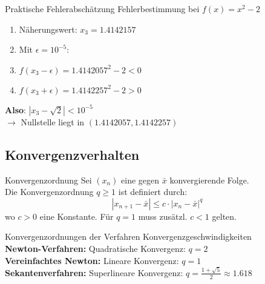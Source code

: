 \begin{example2}{Praktische Fehlerabschätzung} Fehlerbestimmung bei $f(x)=x^2-2$
    \vspace{-1mm}\\
    \begin{minipage}[t]{0.6\textwidth}
        \vspace{-3mm}
        \begin{enumerate}
            \item Näherungswert: $x_3 = 1.4142157$
            \item Mit $\epsilon = 10^{-5}$:
            \item $f(x_3-\epsilon) = 1.4142057^2 - 2 < 0$
            \item $f(x_3+\epsilon) = 1.4142257^2 - 2 > 0$
        \end{enumerate}
    \end{minipage}
    \begin{minipage}[t]{0.35\textwidth}
        \textbf{Also}: $|x_3-\sqrt{2}| < 10^{-5}$
        \vspace{-1mm}\\
        $\rightarrow$ Nullstelle liegt in $(1.4142057, 1.4142257)$
    \end{minipage}
\end{example2}

\subsection{Konvergenzverhalten}

\begin{definition}{Konvergenzordnung}
    Sei $(x_n)$ eine gegen $\bar{x}$ konvergierende Folge. \\
    Die Konvergenzordnung $q \geq 1$ ist definiert durch:
    \vspace{-2mm}\\
    $$|x_{n+1}-\bar{x}| \leq c \cdot |x_n-\bar{x}|^q$$
    wo $c > 0$ eine Konstante. Für $q = 1$ muss zusätzl. $c < 1$ gelten.
\end{definition}

\begin{theorem}{Konvergenzordnungen der Verfahren} Konvergenzgeschwindigkeiten
    \vspace{-2mm}\\
    \textbf{Newton-Verfahren:} Quadratische Konvergenz: $q = 2$
    \vspace{1mm}\\
    \textbf{Vereinfachtes Newton:} Lineare Konvergenz: $q = 1$
    \vspace{1mm}\\
    \textbf{Sekantenverfahren:} Superlineare Konvergenz: $q = \frac{1+\sqrt{5}}{2} \approx 1.618$
\end{theorem}

